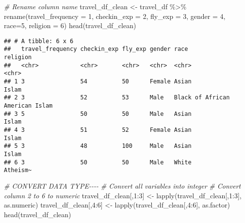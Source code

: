 \documentclass[
]{article}
\newenvironment{Shaded}{\begin{snugshade}}{\end{snugshade}}
\newcommand{\AttributeTok}[1]{\textcolor[rgb]{0.77,0.63,0.00}{#1}}
\newcommand{\CommentTok}[1]{\textcolor[rgb]{0.56,0.35,0.01}{\textit{#1}}}
\newcommand{\DecValTok}[1]{\textcolor[rgb]{0.00,0.00,0.81}{#1}}
\newcommand{\FunctionTok}[1]{\textcolor[rgb]{0.00,0.00,0.00}{#1}}
\newcommand{\NormalTok}[1]{#1}
\newcommand{\OtherTok}[1]{\textcolor[rgb]{0.56,0.35,0.01}{#1}}
\newcommand{\SpecialCharTok}[1]{\textcolor[rgb]{0.00,0.00,0.00}{#1}}
\begin{document}
\hfill\break

\begin{Shaded}
\begin{Highlighting}[]
\CommentTok{\# Rename column name}
\NormalTok{travel\_df\_clean }\OtherTok{\textless{}{-}}\NormalTok{ travel\_df }\SpecialCharTok{\%\textgreater{}\%} 
       \FunctionTok{rename}\NormalTok{(}\AttributeTok{travel\_frequency =} \DecValTok{1}\NormalTok{, }\AttributeTok{checkin\_exp =} \DecValTok{2}\NormalTok{,}
              \AttributeTok{fly\_exp =} \DecValTok{3}\NormalTok{, }\AttributeTok{gender =} \DecValTok{4}\NormalTok{, }\AttributeTok{race=}\DecValTok{5}\NormalTok{,}
              \AttributeTok{religion =} \DecValTok{6}\NormalTok{)}
\FunctionTok{head}\NormalTok{(travel\_df\_clean)}
\end{Highlighting}
\end{Shaded}

\begin{verbatim}
## # A tibble: 6 x 6
##   travel_frequency checkin_exp fly_exp gender race                      religion
##   <chr>            <chr>       <chr>   <chr>  <chr>                     <chr>   
## 1 3                54          50      Female Asian                     Islam   
## 2 3                52          53      Male   Black of African American Islam   
## 3 5                50          50      Male   Asian                     Islam   
## 4 3                51          52      Female Asian                     Islam   
## 5 3                48          100     Male   Asian                     Islam   
## 6 3                50          50      Male   White                     Atheism~
\end{verbatim}

\hfill\break

\begin{Shaded}
\begin{Highlighting}[]
\CommentTok{\# CONVERT DATA TYPE{-}{-}{-}{-}}
\CommentTok{\# Convert all variables into integer}
\CommentTok{\# Convert column 2 to 6 to numeric}
\NormalTok{travel\_df\_clean[,}\DecValTok{1}\SpecialCharTok{:}\DecValTok{3}\NormalTok{] }\OtherTok{\textless{}{-}} \FunctionTok{lapply}\NormalTok{(travel\_df\_clean[,}\DecValTok{1}\SpecialCharTok{:}\DecValTok{3}\NormalTok{], as.numeric)}
\NormalTok{travel\_df\_clean[,}\DecValTok{4}\SpecialCharTok{:}\DecValTok{6}\NormalTok{] }\OtherTok{\textless{}{-}} \FunctionTok{lapply}\NormalTok{(travel\_df\_clean[,}\DecValTok{4}\SpecialCharTok{:}\DecValTok{6}\NormalTok{], as.factor)}
\FunctionTok{head}\NormalTok{(travel\_df\_clean)}
\end{Highlighting}
\end{Shaded}
\end{document}
